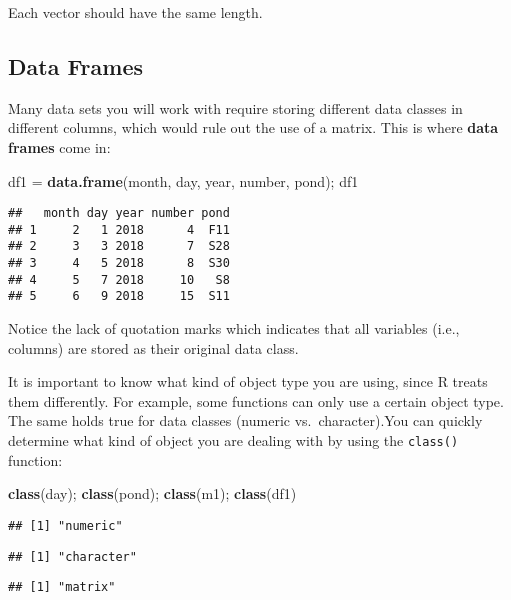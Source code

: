 \documentclass[]{book}
\newenvironment{Shaded}{\begin{snugshade}}{\end{snugshade}}
\newcommand{\KeywordTok}[1]{\textcolor[rgb]{0.13,0.29,0.53}{\textbf{#1}}}
\newcommand{\StringTok}[1]{\textcolor[rgb]{0.31,0.60,0.02}{#1}}
\newcommand{\NormalTok}[1]{#1}
\theoremstyle{definition}
\theoremstyle{definition}
\theoremstyle{definition}
\theoremstyle{remark}
\begin{document}
Each vector should have the same length.

\subsection{Data Frames}\label{data-frames}

Many data sets you will work with require storing different data classes
in different columns, which would rule out the use of a matrix. This is
where \textbf{data frames} come in:

\begin{Shaded}
\begin{Highlighting}[]
\NormalTok{df1 =}\StringTok{ }\KeywordTok{data.frame}\NormalTok{(month, day, year, number, pond); df1}
\end{Highlighting}
\end{Shaded}

\begin{verbatim}
##   month day year number pond
## 1     2   1 2018      4  F11
## 2     3   3 2018      7  S28
## 3     4   5 2018      8  S30
## 4     5   7 2018     10   S8
## 5     6   9 2018     15  S11
\end{verbatim}

Notice the lack of quotation marks which indicates that all variables
(i.e., columns) are stored as their original data class.

It is important to know what kind of object type you are using, since R
treats them differently. For example, some functions can only use a
certain object type. The same holds true for data classes (numeric
vs.~character).You can quickly determine what kind of object you are
dealing with by using the \texttt{class()} function:

\begin{Shaded}
\begin{Highlighting}[]
\KeywordTok{class}\NormalTok{(day); }\KeywordTok{class}\NormalTok{(pond); }\KeywordTok{class}\NormalTok{(m1); }\KeywordTok{class}\NormalTok{(df1)}
\end{Highlighting}
\end{Shaded}

\begin{verbatim}
## [1] "numeric"
\end{verbatim}

\begin{verbatim}
## [1] "character"
\end{verbatim}

\begin{verbatim}
## [1] "matrix"
\end{verbatim}
\end{document}

